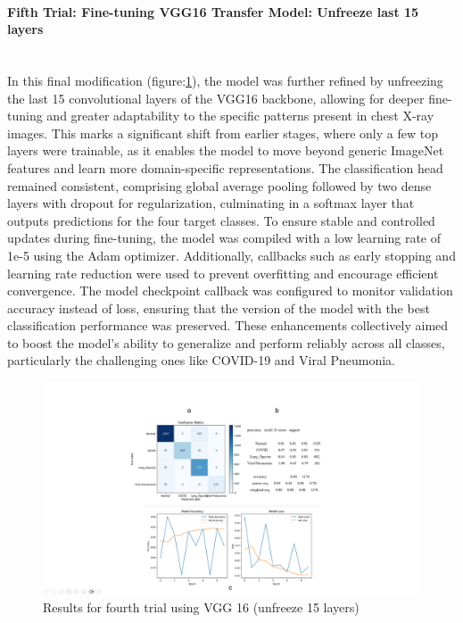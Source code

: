 \documentclass{article}
\begin{document}
\paragraph{Fifth Trial: Fine-tuning VGG16 Transfer Model: Unfreeze last 15 layers}\mbox{}\\
In this final modification (figure:\ref{fig:vgg16result5.png}), the model was further refined by unfreezing the last 15 convolutional layers of the VGG16 backbone, allowing for deeper fine-tuning and greater adaptability to the specific patterns present in chest X-ray images. This marks a significant shift from earlier stages, where only a few top layers were trainable, as it enables the model to move beyond generic ImageNet features and learn more domain-specific representations. The classification head remained consistent, comprising global average pooling followed by two dense layers with dropout for regularization, culminating in a softmax layer that outputs predictions for the four target classes. To ensure stable and controlled updates during fine-tuning, the model was compiled with a low learning rate of 1e-5 using the Adam optimizer. Additionally, callbacks such as early stopping and learning rate reduction were used to prevent overfitting and encourage efficient convergence. The model checkpoint callback was configured to monitor validation accuracy instead of loss, ensuring that the version of the model with the best classification performance was preserved. These enhancements collectively aimed to boost the model's ability to generalize and perform reliably across all classes, particularly the challenging ones like COVID-19 and Viral Pneumonia.
\begin{figure}[h!] %
    \centering
    \includegraphics[width=1.0\linewidth]{vgg15-15.png}
    \caption{Results for fourth trial using VGG 16 (unfreeze 15 layers)}
    \label{fig:vgg16result5.png}
\end{figure}
\end{document}
